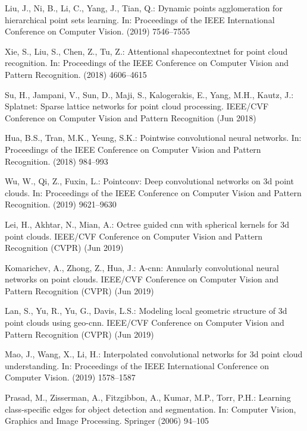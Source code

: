 \documentclass[runningheads]{llncs}
\begin{document}
\begin{thebibliography}{10}
Liu, J., Ni, B., Li, C., Yang, J., Tian, Q.:
\newblock Dynamic points agglomeration for hierarchical point sets learning.
\newblock In: Proceedings of the IEEE International Conference on Computer
  Vision. (2019)  7546--7555

Xie, S., Liu, S., Chen, Z., Tu, Z.:
\newblock Attentional shapecontextnet for point cloud recognition.
\newblock In: Proceedings of the IEEE Conference on Computer Vision and Pattern
  Recognition. (2018)  4606--4615

Su, H., Jampani, V., Sun, D., Maji, S., Kalogerakis, E., Yang, M.H., Kautz, J.:
\newblock Splatnet: Sparse lattice networks for point cloud processing.
 IEEE/CVF Conference on Computer Vision and Pattern Recognition
  (Jun 2018)

Hua, B.S., Tran, M.K., Yeung, S.K.:
\newblock Pointwise convolutional neural networks.
\newblock In: Proceedings of the IEEE Conference on Computer Vision and Pattern
  Recognition. (2018)  984--993

Wu, W., Qi, Z., Fuxin, L.:
\newblock Pointconv: Deep convolutional networks on 3d point clouds.
\newblock In: Proceedings of the IEEE Conference on Computer Vision and Pattern
  Recognition. (2019)  9621--9630

Lei, H., Akhtar, N., Mian, A.:
\newblock Octree guided cnn with spherical kernels for 3d point clouds.
 IEEE/CVF Conference on Computer Vision and Pattern Recognition
  (CVPR) (Jun 2019)

Komarichev, A., Zhong, Z., Hua, J.:
\newblock A-cnn: Annularly convolutional neural networks on point clouds.
 IEEE/CVF Conference on Computer Vision and Pattern Recognition
  (CVPR) (Jun 2019)

Lan, S., Yu, R., Yu, G., Davis, L.S.:
\newblock Modeling local geometric structure of 3d point clouds using geo-cnn.
 IEEE/CVF Conference on Computer Vision and Pattern Recognition
  (CVPR) (Jun 2019)

Mao, J., Wang, X., Li, H.:
\newblock Interpolated convolutional networks for 3d point cloud understanding.
\newblock In: Proceedings of the IEEE International Conference on Computer
  Vision. (2019)  1578--1587

Prasad, M., Zisserman, A., Fitzgibbon, A., Kumar, M.P., Torr, P.H.:
\newblock Learning class-specific edges for object detection and segmentation.
\newblock In: Computer Vision, Graphics and Image Processing.
\newblock Springer (2006)  94--105


\end{thebibliography}
\end{document}
